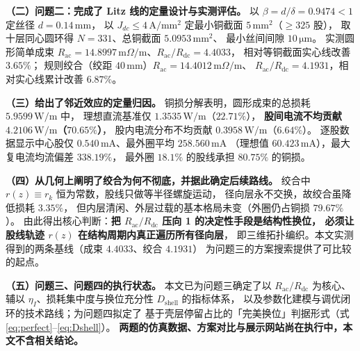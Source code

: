 \documentclass[12pt, a4paper]{ctexart}
\newcommand{\Rac}{R_{\mathrm{ac}}}
\newcommand{\Rdc}{R_{\mathrm{dc}}}
\newcommand{\U}[1]{\ensuremath{\,\mathrm{#1}}}
\newcommand{\Uohm}{\ensuremath{\,\mathrm{m}\Omega/\mathrm{m}}}%
\begin{document}
\textbf{（二）问题二：完成了 Litz 线的定量设计与实测评估。}
以 $\beta = d/\delta = 0.9474 < 1$ 定丝径 $d = 0.14\U{mm}$，
以 $J_{dc}\le4\U{A/mm^2}$ 定最小铜截面 $5\U{mm^2}$（$\ge325$ 股），
取十层同心圆环得 $N = 331$、总铜截面 $5.0953\U{mm^2}$、
最小丝间间隙 $10\U{\mu m}$。
实测圆形简单成束 $\Rac = 14.8997\Uohm$、$\Rac/\Rdc = 4.4033$，
相对等铜截面实心线改善 $3.65\%$；
规则绞合（绞距 $40\U{mm}$）$\Rac = 14.4012\Uohm$、
$\Rac/\Rdc = 4.1931$，相对实心线累计改善 $6.87\%$。

\textbf{（三）给出了邻近效应的定量归因。}
铜损分解表明，圆形成束的总损耗 $5.9599\U{W/m}$ 中，
理想直流基准仅 $1.3535\U{W/m}$（$22.71\%$），
\textbf{股间电流不均贡献 $4.2106\U{W/m}$（$70.65\%$）}，
股内电流分布不均贡献 $0.3958\U{W/m}$（$6.64\%$）。
逐股数据显示中心股仅 $0.540\U{mA}$、最外圈平均 $258.560\U{mA}$
（理想值 $60.423\U{mA}$），最大复电流均流偏差 $338.19\%$，
最外圈 $18.1\%$ 的股线承担 $80.75\%$ 的铜损。

\textbf{（四）从几何上阐明了绞合为何不彻底，并据此确定后续路线。}
绞合中 $r(z)\equiv r_k$ 恒为常数，股线只做等半径螺旋运动，
径向层永不交换，故绞合虽降低损耗 $3.35\%$，
但内层清闲、外层过载的基本格局未变（外圈仍占铜损 $79.67\%$）。
由此得出核心判断：\textbf{把 $\Rac/\Rdc$ 压向 1 的决定性手段是结构性换位，
必须让股线轨迹 $r(z)$ 在结构周期内真正遍历所有径向层}，
即三维拓扑编织。本文实测得到的两条基线（成束 $4.4033$、绞合 $4.1931$）
为问题三的方案搜索提供了可比较的起点。

\textbf{（五）问题三、问题四的执行状态。}
本文已为问题三确定了以 $\Rac/\Rdc$ 为核心、
辅以 $\eta_I$、损耗集中度与换位充分性 $D_{\mathrm{shell}}$ 的指标体系，
以及参数化建模与调优闭环的技术路线；为问题四拟定了
基于壳层停留占比的「完美换位」判据形式（式 \eqref{eq:perfect}--\eqref{eq:Dshell}）。
\textbf{两题的仿真数据、方案对比与展示网站尚在执行中，本文不含相关结论。}
\end{document}
